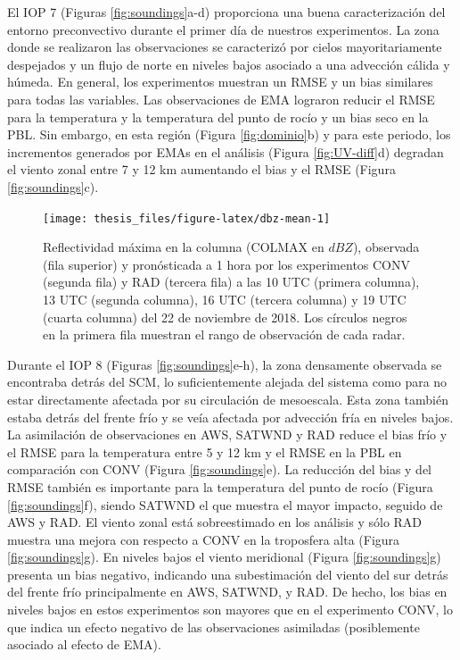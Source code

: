 \documentclass[12pt,oneside]{reedthesis}
\begin{document}
El IOP 7 (Figuras \ref{fig:soundings}a-d) proporciona una buena caracterización del entorno preconvectivo durante el primer día de nuestros experimentos. La zona donde se realizaron las observaciones se caracterizó por cielos mayoritariamente despejados y un flujo de norte en niveles bajos asociado a una advección cálida y húmeda. En general, los experimentos muestran un RMSE y un bias similares para todas las variables. Las observaciones de EMA lograron reducir el RMSE para la temperatura y la temperatura del punto de rocío y un bias seco en la PBL. Sin embargo, en esta región (Figura \ref{fig:dominio}b) y para este periodo, los incrementos generados por EMAs en el análisis (Figura \ref{fig:UV-diff}d) degradan el viento zonal entre 7 y 12 km aumentando el bias y el RMSE (Figura \ref{fig:soundings}c).


\begin{figure}
\texttt{[image: thesis\_files/figure-latex/dbz-mean-1]} \caption{Reflectividad máxima en la columna (COLMAX en \(dBZ\)), observada (fila superior) y pronósticada a 1 hora por los experimentos CONV (segunda fila) y RAD (tercera fila) a las 10 UTC (primera columna), 13 UTC (segunda columna), 16 UTC (tercera columna) y 19 UTC (cuarta columna) del 22 de noviembre de 2018. Los círculos negros en la primera fila muestran el rango de observación de cada radar.}\label{fig:dbz-mean}
\end{figure}
Durante el IOP 8 (Figuras \ref{fig:soundings}e-h), la zona densamente observada se encontraba detrás del SCM, lo suficientemente alejada del sistema como para no estar directamente afectada por su circulación de mesoescala. Esta zona también estaba detrás del frente frío y se veía afectada por advección fría en niveles bajos. La asimilación de observaciones en AWS, SATWND y RAD reduce el bias frío y el RMSE para la temperatura entre 5 y 12 km y el RMSE en la PBL en comparación con CONV (Figura \ref{fig:soundings}e). La reducción del bias y del RMSE también es importante para la temperatura del punto de rocío (Figura \ref{fig:soundings}f), siendo SATWND el que muestra el mayor impacto, seguido de AWS y RAD. El viento zonal está sobreestimado en los análisis y sólo RAD muestra una mejora con respecto a CONV en la troposfera alta (Figura \ref{fig:soundings}g). En niveles bajos el viento meridional (Figura \ref{fig:soundings}g) presenta un bias negativo, indicando una subestimación del viento del sur detrás del frente frío principalmente en AWS, SATWND, y RAD. De hecho, los bias en niveles bajos en estos experimentos son mayores que en el experimento CONV, lo que indica un efecto negativo de las observaciones asimiladas (posiblemente asociado al efecto de EMA).
\end{document}
